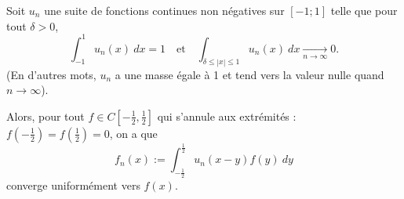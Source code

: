 \begin{lemme}[Lissage] \label{lem:lissage}
    Soit $u_n$ une suite de fonctions continues non négatives sur $[-1;1]$ telle que pour tout $\delta>0$,
    \begin{equation*}
        \int_{-1}^1 u_n(x)\ dx = 1 \quad\mathrm{et}\quad \int_{\delta\leq|x|\leq1} u_n(x)\ dx \underset{n\to \infty}{\rightarrow} 0.
    \end{equation*}
    (En d'autres mots, $u_n$ a une masse égale à 1 et tend vers la valeur nulle quand $n\to\infty$).
    
    Alors, pour tout $f\in C\left[ -\frac{1}{2},\frac{1}{2} \right]$ qui s'annule aux extrémités : $f\left(-\frac{1}{2}\right) = f\left(\frac{1}{2}\right) = 0$, on a que
    \begin{equation*}
        f_n(x) := \int_{-\frac{1}{2}}^\frac{1}{2} u_n(x-y)f(y)\ dy
    \end{equation*}
    converge uniformément vers $f(x)$.
\end{lemme}


